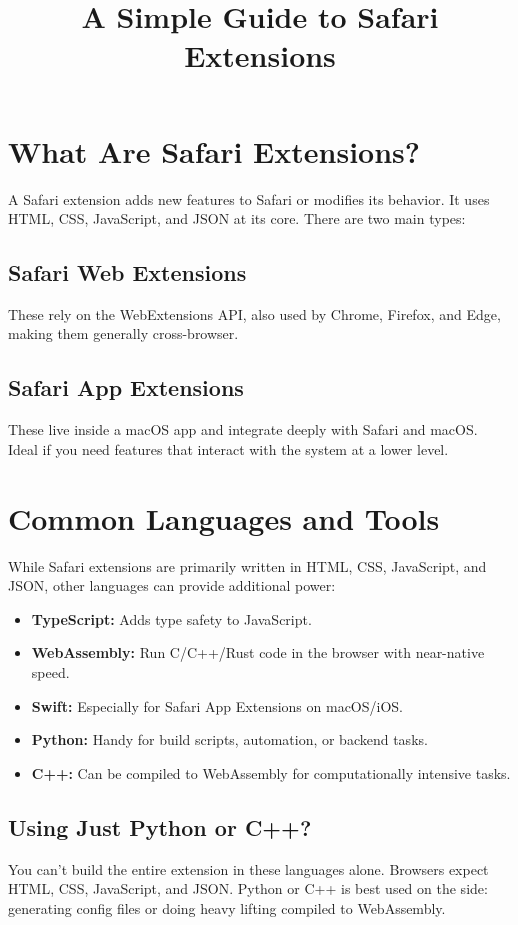 \documentclass[12pt,a4paper]{article}
\title{\Huge A Simple Guide to Safari Extensions}
\date{}   %
\author{} %
\begin{document}
\maketitle

\section{What Are Safari Extensions?}
A Safari extension adds new features to Safari or modifies its behavior. It uses HTML, CSS, JavaScript, and JSON at its core. There are two main types:

\subsection{Safari Web Extensions}
These rely on the WebExtensions API, also used by Chrome, Firefox, and Edge, making them generally cross-browser.

\subsection{Safari App Extensions}
These live inside a macOS app and integrate deeply with Safari and macOS. Ideal if you need features that interact with the system at a lower level.

\section{Common Languages and Tools}
While Safari extensions are primarily written in HTML, CSS, JavaScript, and JSON, other languages can provide additional power:

\begin{itemize}
  \item \textbf{TypeScript:} Adds type safety to JavaScript.
  \item \textbf{WebAssembly:} Run C/C++/Rust code in the browser with near-native speed.
  \item \textbf{Swift:} Especially for Safari App Extensions on macOS/iOS.
  \item \textbf{Python:} Handy for build scripts, automation, or backend tasks.
  \item \textbf{C++:} Can be compiled to WebAssembly for computationally intensive tasks.
\end{itemize}

\subsection{Using Just Python or C++?}
You can’t build the entire extension in these languages alone. Browsers expect HTML, CSS, JavaScript, and JSON. Python or C++ is best used on the side: generating config files or doing heavy lifting compiled to WebAssembly.
\end{document}
